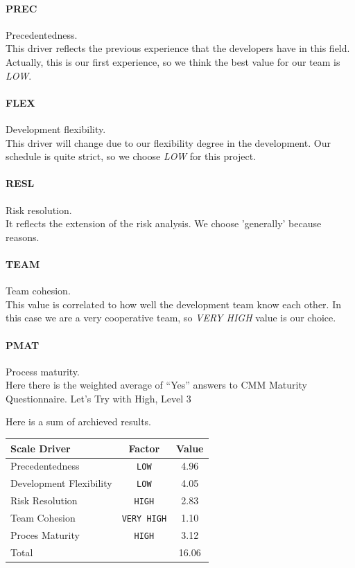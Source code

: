 \paragraph{PREC} Precedentedness. \\ 
This driver reflects the previous experience that the developers have in this 
field. Actually, this is our first experience, so we think the best value for
our team is \emph{LOW}.

\paragraph{FLEX} Development flexibility. \\
This driver will change due to our flexibility degree in the development.
Our schedule is quite strict, so we choose \emph{LOW} for this project.

\paragraph{RESL} Risk resolution. \\
It reflects the extension of the risk analysis. We choose 'generally'
because reasons. %

\paragraph{TEAM} Team cohesion. \\
This value is correlated to how well the development team know each other. 
In this case we are a very cooperative team, so \emph{VERY HIGH} value is
our choice.

\paragraph{PMAT} Process maturity. \\
Here there is the weighted average of ``Yes'' answers to CMM Maturity Questionnaire.
Let's Try with High, Level 3

Here is a sum of archieved results.

\begin{tabular}{ p{5cm} | c | c }
    Scale Driver            & Factor             &  Value   \\ \hline
    Precedentedness         & \texttt{LOW}       &  4.96    \\
    Development Flexibility & \texttt{LOW}       &  4.05    \\
    Risk Resolution         & \texttt{HIGH}      &  2.83    \\
    Team Cohesion           & \texttt{VERY HIGH} &  1.10    \\
    Proces Maturity         & \texttt{HIGH}      &  3.12    \\ \hline
    Total                   &                    & 16.06  
\end{tabular}

